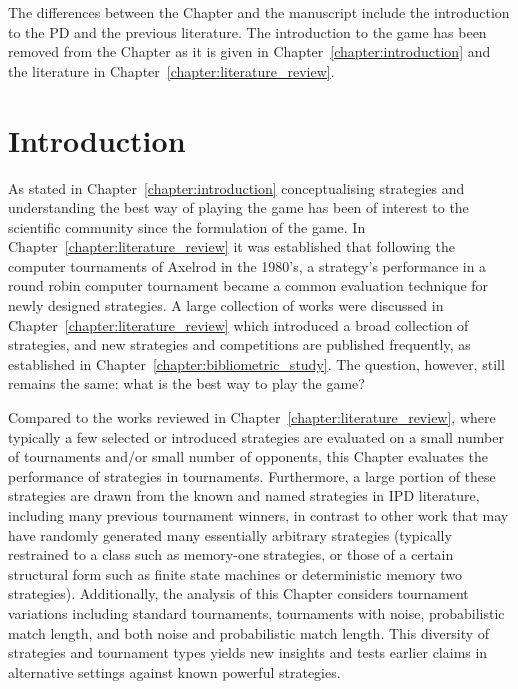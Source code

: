 \hrulefill

The differences between the Chapter and the manuscript include the introduction
to the PD and the previous literature. The introduction to the game has been
removed from the Chapter as it is given in Chapter~\ref{chapter:introduction}
and the literature in Chapter~\ref{chapter:literature_review}.

\section{Introduction}

As stated in Chapter~\ref{chapter:introduction} conceptualising strategies and
understanding the best way of playing the game has been of interest to the
scientific community since the formulation of the game. In
Chapter~\ref{chapter:literature_review} it was established that following the
computer tournaments of Axelrod in the 1980's, a strategy's performance in a
round robin computer tournament became a common evaluation technique for newly
designed strategies. A large collection of works were discussed in
Chapter~\ref{chapter:literature_review} which introduced a broad collection of
strategies, and new strategies and competitions are published frequently,
as established in Chapter~\ref{chapter:bibliometric_study}. The question,
however, still remains the same: what is the best way to play the game?

Compared to the works reviewed in Chapter~\ref{chapter:literature_review}, where
typically a few selected or introduced strategies are evaluated on a small
number of tournaments and/or small number of opponents, this Chapter evaluates
the performance of \numberofstrategies strategies in \numberofalltournaments
tournaments. Furthermore, a large portion of these strategies are drawn from the
known and named strategies in IPD literature, including many previous tournament
winners, in contrast to other work that may have randomly generated many
essentially arbitrary strategies (typically restrained to a class such as
memory-one strategies, or those of a certain structural form such as finite
state machines or deterministic memory two strategies). Additionally, the
analysis of this Chapter considers tournament variations including standard
tournaments, tournaments with noise, probabilistic match length, and both noise
and probabilistic match length. This diversity of strategies and tournament
types yields new insights and tests earlier claims in alternative settings
against known powerful strategies.


